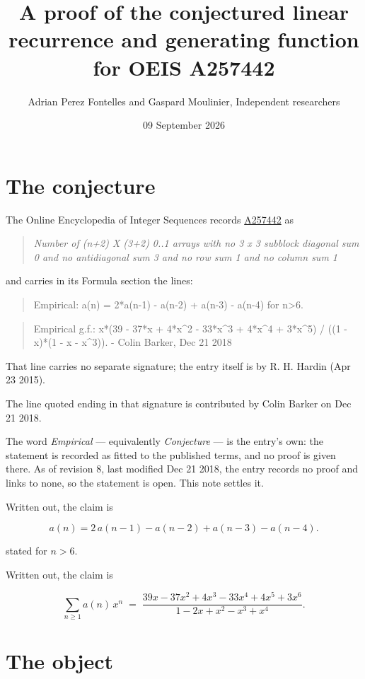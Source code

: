 \documentclass[11pt]{article}
\title{A proof of the conjectured linear recurrence and generating function for OEIS A257442}
\author{Adrian Perez Fontelles and Gaspard Moulinier, Independent researchers}
\date{09 September 2026}
\theoremstyle{definition}
\begin{document}
\maketitle
\section{The conjecture}

The Online Encyclopedia of Integer Sequences records \href{https://oeis.org/A257442}{A257442} as

\begin{quote}\itshape Number of (n+2) X (3+2) 0..1 arrays with no 3 x 3 subblock diagonal sum 0 and no antidiagonal sum 3 and no row sum 1 and no column sum 1\end{quote}

and carries in its Formula section the lines:

\begin{quote}\ttfamily Empirical: a(n) = 2*a(n-1) - a(n-2) + a(n-3) - a(n-4) for n>6.\end{quote}

\begin{quote}\ttfamily Empirical g.f.: x*(39 - 37*x + 4*x\textasciicircum{}2 - 33*x\textasciicircum{}3 + 4*x\textasciicircum{}4 + 3*x\textasciicircum{}5) / ((1 - x)*(1 - x - x\textasciicircum{}3)). - Colin Barker, Dec 21 2018\end{quote}

That line carries no separate signature; the entry itself is by R. H. Hardin (Apr 23 2015).

The line quoted ending in that signature is contributed by Colin Barker on Dec 21 2018.

The word {\itshape Empirical} --- equivalently {\itshape Conjecture} --- is the entry's own: the statement is recorded as fitted to the published terms, and no proof is given there. As of revision 8, last modified Dec 21 2018, the entry records no proof and links to none, so the statement is open. This note settles it.

Written out, the claim is

\[a(n) = 2\,a(n-1) - a(n-2) + a(n-3) - a(n-4).\]

stated for $n > 6$.

Written out, the claim is

\[\sum_{n \ge 1} a(n)\,x^n \;=\; \frac{39x - 37x^{2} + 4x^{3} - 33x^{4} + 4x^{5} + 3x^{6}}{1 - 2x + x^{2} - x^{3} + x^{4}}.\]

\section{The object}
\end{document}

